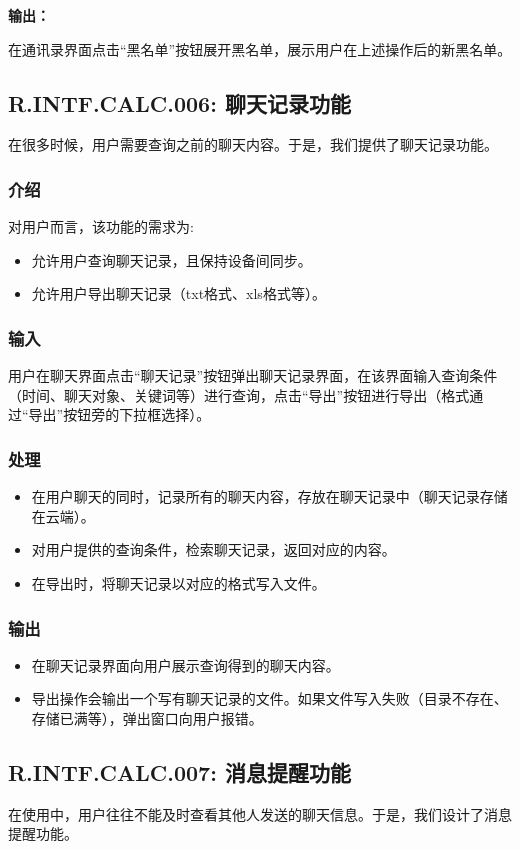 \textbf{输出：}

在通讯录界面点击“黑名单”按钮展开黑名单，展示用户在上述操作后的新黑名单。

\subsection{R.INTF.CALC.006: 聊天记录功能}
在很多时候，用户需要查询之前的聊天内容。于是，我们提供了聊天记录功能。
\subsubsection{介绍}
对用户而言，该功能的需求为:
\begin{itemize}
  \item 允许用户查询聊天记录，且保持设备间同步。
  \item 允许用户导出聊天记录（txt格式、xls格式等）。
\end{itemize}
\subsubsection{输入}
用户在聊天界面点击“聊天记录”按钮弹出聊天记录界面，在该界面输入查询条件（时间、聊天对象、关键词等）进行查询，点击“导出”按钮进行导出（格式通过“导出”按钮旁的下拉框选择）。
\subsubsection{处理}
\begin{itemize}
  \item 在用户聊天的同时，记录所有的聊天内容，存放在聊天记录中（聊天记录存储在云端）。
  \item 对用户提供的查询条件，检索聊天记录，返回对应的内容。
  \item 在导出时，将聊天记录以对应的格式写入文件。
\end{itemize}
\subsubsection{输出}
\begin{itemize}
  \item 在聊天记录界面向用户展示查询得到的聊天内容。
  \item 导出操作会输出一个写有聊天记录的文件。如果文件写入失败（目录不存在、存储已满等），弹出窗口向用户报错。
\end{itemize}

\subsection{R.INTF.CALC.007: 消息提醒功能}
在使用中，用户往往不能及时查看其他人发送的聊天信息。于是，我们设计了消息提醒功能。
